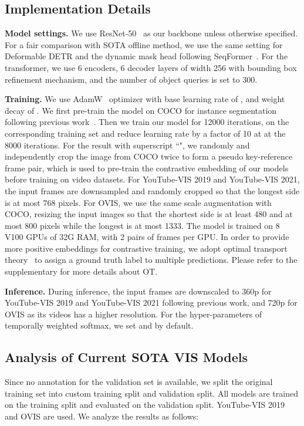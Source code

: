 \documentclass[runningheads]{llncs}
\begin{document}
\subsection{Implementation Details}
\noindent\textbf{Model settings.} We use ResNet-50~\cite{resnet} as our backbone unless otherwise specified. For a fair comparison with SOTA offline method, we use the same setting for Deformable DETR and the dynamic mask head following SeqFormer~\cite{seqformer}. For the transformer, we use 6 encoders, 6 decoder layers of width 256 with bounding box refinement mechanism, and the number of object queries is set to 300. 


\noindent\textbf{Training.}
We use AdamW~\cite{AdamW} optimizer with base learning rate of , and weight decay of . We first pre-train the model on COCO for instance segmentation following previous work~\cite{VisTR,IFC,CrossVIS,seqformer}. 
Then we train our model for 12000 iterations, on the corresponding training set and reduce learning rate by a factor of 10 at at the 8000 iterations.
For the result with superscript ``\dag",
we randomly and independently crop the image from COCO twice to form a pseudo key-reference frame pair, which is used to pre-train the contrastive embedding of our models before training on video datasets.
For YouTube-VIS 2019 and YouTube-VIS 2021, the input frames are downsampled and randomly cropped so that the longest side is at most 768 pixels. For OVIS, we use the same scale augmentation with COCO, resizing the input images so that the shortest
side is at least 480 and at most 800 pixels while the longest is at most 1333. The model is trained on 8 V100 GPUs of 32G RAM, with 2 pairs of frames per GPU.
In order to provide more positive embeddings for contrastive training, we adopt optimal transport theory~\cite{OTA,yolox} to assign a ground truth label to multiple predictions. 
Please refer to the supplementary for more details about OT.



\begin{sloppypar} 
\noindent\textbf{Inference.}
During inference, the input frames are downscaled to 360p for YouTube-VIS 2019 and YouTube-VIS 2021 following previous work, and 720p for OVIS as its videos has a higher resolution. For the  hyper-parameters of temporally weighted softmax, we set  and  by default. 
\end{sloppypar}





\subsection{Analysis of Current SOTA VIS Models}
\label{sec:VIS-Analysis}
Since no annotation for the validation set is available, we split the original training set into custom training split and validation split. All models are trained on the training split and evaluated on the validation split. YouTube-VIS 2019 and OVIS are used. We analyze the results as follows:
\end{document}
